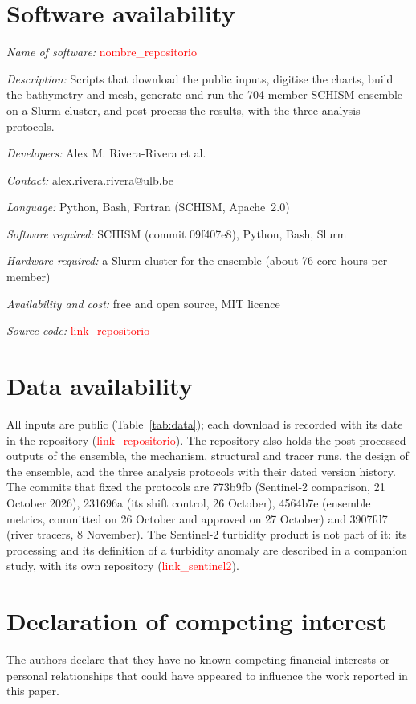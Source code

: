 \documentclass[a4paper,fleqn]{ems-dc}
\newcommand{\ph}[1]{\textcolor{red}{\textsf{#1}}}
\begin{document}
\section*{Software availability}
\noindent\textit{Name of software:} \ph{nombre\_repositorio}\par
\noindent\textit{Description:} Scripts that download the public inputs, digitise the
charts, build the bathymetry and mesh, generate and run the 704-member SCHISM ensemble on
a Slurm cluster, and post-process the results, with the three analysis protocols.\par
\noindent\textit{Developers:} Alex M. Rivera-Rivera et al.\par
\noindent\textit{Contact:} alex.rivera.rivera@ulb.be\par
\noindent\textit{Language:} Python, Bash, Fortran (SCHISM, Apache~2.0)\par
\noindent\textit{Software required:} SCHISM (commit 09f407e8), Python, Bash, Slurm\par
\noindent\textit{Hardware required:} a Slurm cluster for the ensemble (about 76 core-hours
per member)\par
\noindent\textit{Availability and cost:} free and open source, MIT licence\par
\noindent\textit{Source code:} \ph{link\_repositorio}

\section*{Data availability}
All inputs are public (Table~\ref{tab:data}); each download is recorded with its date in
the repository (\ph{link\_repositorio}). The repository also holds the post-processed
outputs of the ensemble, the mechanism, structural and tracer runs, the design of the
ensemble, and the three analysis protocols with their dated version history. The commits
that fixed the protocols are 773b9fb (Sentinel-2 comparison, 21 October 2026), 231696a (its
shift control, 26 October), 4564b7e (ensemble metrics, committed on 26 October and approved
on 27 October) and 3907fd7 (river tracers, 8 November). The Sentinel-2 turbidity product is
not part of it: its processing and its definition of a turbidity anomaly are described in a
companion study, with its own repository (\ph{link\_sentinel2}).

\section*{Declaration of competing interest}
The authors declare that they have no known competing financial interests or personal
relationships that could have appeared to influence the work reported in this paper.
\end{document}
